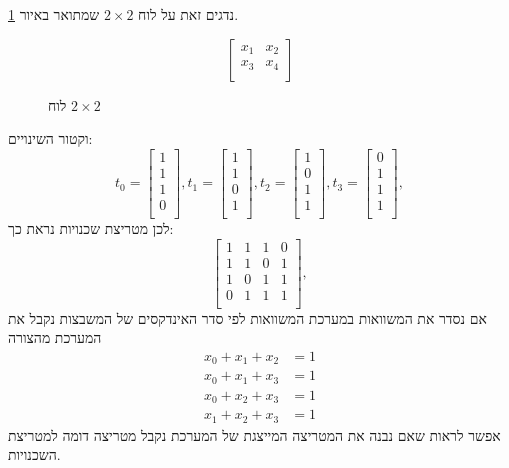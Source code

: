 \documentclass[12pt,leqno]{article}
\theoremstyle{theoremdd}
\begin{document}
נדגים זאת על לוח 
$2 \times 2$
שמתואר באיור
\ref{fig: 2 x 2 board}.
\begin{figure}[ht]
    \caption{לוח 
    $2 \times 2$
    }
    \label{fig: 2 x 2 board}
    \centering
    \[
        \begin{bmatrix}
            x_1 & x_2 \\
            x_3 & x_4 \\
        \end{bmatrix}
    \]
\end{figure}
וקטור השינויים:
\[
   t_0 = 
    \begin{bmatrix}
        1 \\
        1 \\
        1 \\
        0 \\
    \end{bmatrix},
    t_1 = 
    \begin{bmatrix}
        1 \\
        1 \\
        0 \\
        1 \\
    \end{bmatrix},
    t_2 = 
    \begin{bmatrix}
        1 \\
        0 \\
        1 \\
        1 \\
    \end{bmatrix},
    t_3 = 
    \begin{bmatrix}
        0 \\
        1 \\
        1 \\
        1 \\
    \end{bmatrix},
\]
לכן
מטריצת שכנויות נראת כך:
\[
    \begin{bmatrix}
        1 & 1 & 1 &0 \\
        1 & 1 & 0 & 1 \\
        1 & 0 & 1 & 1 \\
        0 & 1 & 1 & 1 \\
    \end{bmatrix},
\]
אם נסדר את המשוואות במערכת המשוואות לפי סדר 
האינדקסים של המשבצות נקבל את המערכת מהצורה
\begin{align*}
    x_0 + x_1 + x_2 &= 1\\
    x_0 + x_1 + x_3 &= 1\\
    x_0 + x_2 + x_3 &= 1\\
    x_1 + x_2 + x_3 &= 1
\end{align*}
אפשר לראות שאם נבנה את המטריצה המייצגת של המערכת נקבל מטריצה דומה למטריצת השכנויות.
\end{document}
